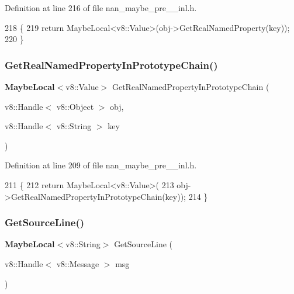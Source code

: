 Definition at line 216 of file nan\+\_\+maybe\+\_\+pre\+\_\+\_\+inl.\+h.


\begin{DoxyCode}
218                             \{
219   \textcolor{keywordflow}{return} MaybeLocal<v8::Value>(obj->GetRealNamedProperty(key));
220 \}
\end{DoxyCode}
\mbox{\label{nan__maybe__pre__43__inl_8h_a79786fddbeb85136cfa68276ca9f8c10}} 
\subsubsection{Get\+Real\+Named\+Property\+In\+Prototype\+Chain()}
{\footnotesize\ttfamily \textbf{ Maybe\+Local}$<$v8\+::\+Value$>$ Get\+Real\+Named\+Property\+In\+Prototype\+Chain (\begin{DoxyParamCaption}\item[{v8\+::\+Handle$<$ v8\+::\+Object $>$}]{obj,  }\item[{v8\+::\+Handle$<$ v8\+::\+String $>$}]{key }\end{DoxyParamCaption})}



Definition at line 209 of file nan\+\_\+maybe\+\_\+pre\+\_\+\_\+inl.\+h.


\begin{DoxyCode}
211                             \{
212   \textcolor{keywordflow}{return} MaybeLocal<v8::Value>(
213       obj->GetRealNamedPropertyInPrototypeChain(key));
214 \}
\end{DoxyCode}
\mbox{\label{nan__maybe__pre__43__inl_8h_a87638d801f9a222e62d3806bd209b87e}} 
\subsubsection{Get\+Source\+Line()}
{\footnotesize\ttfamily \textbf{ Maybe\+Local}$<$v8\+::\+String$>$ Get\+Source\+Line (\begin{DoxyParamCaption}\item[{v8\+::\+Handle$<$ v8\+::\+Message $>$}]{msg }\end{DoxyParamCaption})}



